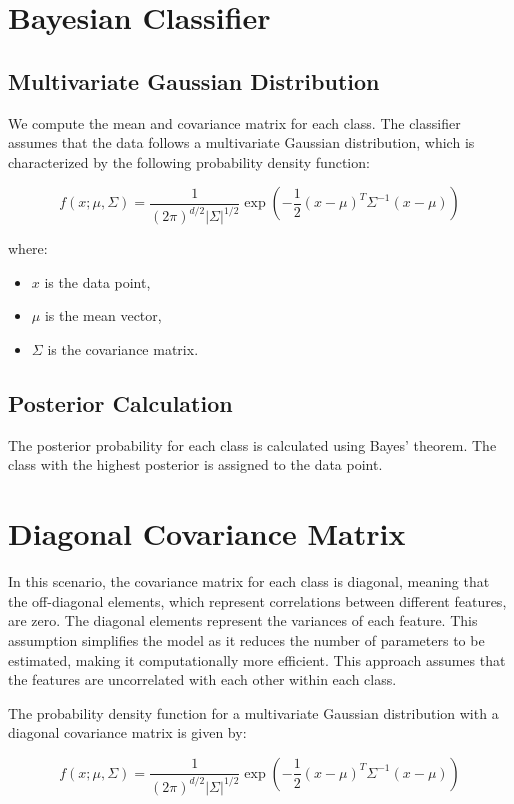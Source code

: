 \documentclass[conference]{IEEEtran}
\begin{document}
	
	
	\section{Bayesian Classifier}
	
	\subsection{Multivariate Gaussian Distribution}
	We compute the mean and covariance matrix for each class. The classifier assumes that the data follows a multivariate Gaussian distribution, which is characterized by the following probability density function:
	
	\[
	f(x; \mu, \Sigma) = \frac{1}{(2\pi)^{d/2} |\Sigma|^{1/2}} \exp\left(-\frac{1}{2} (x - \mu)^T \Sigma^{-1} (x - \mu)\right)
	\]
	
	where:
	\begin{itemize}
		\item \( x \) is the data point,
		\item \( \mu \) is the mean vector,
		\item \( \Sigma \) is the covariance matrix.
	\end{itemize}
	
	\subsection{Posterior Calculation}
	The posterior probability for each class is calculated using Bayes' theorem. The class with the highest posterior is assigned to the data point.
	
	\section{Diagonal Covariance Matrix}
	In this scenario, the covariance matrix for each class is diagonal, meaning that the off-diagonal elements, which represent correlations between different features, are zero. The diagonal elements represent the variances of each feature. This assumption simplifies the model as it reduces the number of parameters to be estimated, making it computationally more efficient. This approach assumes that the features are uncorrelated with each other within each class.
	
	The probability density function for a multivariate Gaussian distribution with a diagonal covariance matrix is given by:
	
	\[
	f(x; \mu, \Sigma) = \frac{1}{(2\pi)^{d/2} |\Sigma|^{1/2}} \exp\left(-\frac{1}{2} (x - \mu)^T \Sigma^{-1} (x - \mu)\right)
	\]
	
\end{document}
